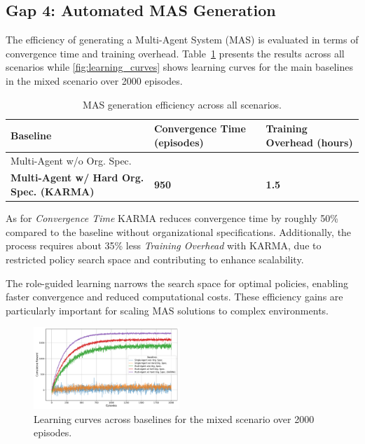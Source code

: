 \documentclass[conference]{IEEEtran}
\begin{document}
\subsection{Gap 4: Automated MAS Generation}

The efficiency of generating a Multi-Agent System (MAS) is evaluated in terms of convergence time and training overhead. Table~\ref{tab:mas_generation_efficiency} presents the results across all scenarios while \autoref{fig:learning_curves} shows learning curves for the main baselines in the mixed scenario over 2000 episodes.

\begin{table}[h]
    \centering
    \caption{MAS generation efficiency across all scenarios.}
    \label{tab:mas_generation_efficiency}
    \begin{tabular}{>{\raggedright\arraybackslash}m{3.5cm}>{\centering\arraybackslash}m{2cm}>{\centering\arraybackslash}m{2cm}}
        \hline
        \textbf{Baseline} & \textbf{Convergence Time (episodes)} & \textbf{Training Overhead (hours)} \\
        \hline
        Multi-Agent w/o Org. Spec. & 1800 & 4 \\
        \textbf{Multi-Agent w/ Hard Org. Spec. (KARMA)} & \textbf{950} & \textbf{1.5} \\
        \hline
    \end{tabular}
\end{table}

As for \textit{Convergence Time} KARMA reduces convergence time by roughly 50\% compared to the baseline without organizational specifications. Additionally, the process requires about 35\% less \textit{Training Overhead} with KARMA, due to restricted policy search space and contributing to enhance scalability.

The role-guided learning narrows the search space for optimal policies, enabling faster convergence and reduced computational costs. These efficiency gains are particularly important for scaling MAS solutions to complex environments.

\begin{figure}[h!]
    \centering
    \includegraphics[width=0.49\textwidth]{figures/learning_curves.pdf}
    \caption{Learning curves across baselines for the mixed scenario over 2000 episodes.}
    \label{fig:learning_curves}
\end{figure}
\end{document}
